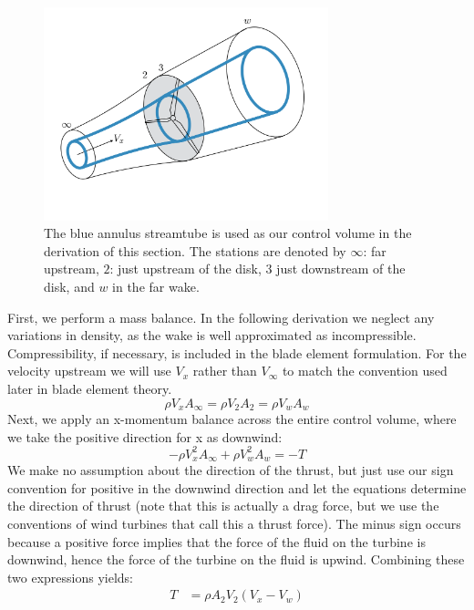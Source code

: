 \documentclass{article}
\begin{document}
\begin{figure}[htbp]
\centering
\includegraphics[width=3.25in]{figures/annulus}
\caption{The blue annulus streamtube is used as our control volume in the derivation of this section.  The stations are denoted by $\infty$: far upstream, $2$: just upstream of the disk, $3$ just downstream of the disk, and $w$ in the far wake.}
\label{fig:annulus}
\end{figure}

First, we perform a mass balance.  In the following derivation we neglect any variations in density, as the wake is well approximated as incompressible.  Compressibility, if necessary, is included in the blade element formulation.  For the velocity upstream we will use $V_x$ rather than $V_\infty$ to match the convention used later in blade element theory.
\begin{equation}
    \rho V_x A_\infty = \rho V_2 A_2 = \rho V_w A_w
\end{equation}
Next, we apply an x-momentum balance across the entire control volume, where we take the positive direction for x as downwind:
\begin{equation}
    -\rho V_x^2 A_\infty + \rho V_w^2 A_w = - T
\end{equation}
We make no assumption about the direction of the thrust, but just use our sign convention for positive in the downwind direction and let the equations determine the direction of thrust (note that this is actually a drag force, but we use the conventions of wind turbines that call this a thrust force).  The minus sign occurs because a positive force implies that the force of the fluid on the turbine is downwind, hence the force of the turbine on the fluid is upwind.  Combining these two expressions yields:
\begin{equation}
\begin{aligned}
    T &= \rho A_2 V_2 (V_x - V_w)\\
\end{aligned}
\label{eq:thrust1}
\end{equation}
\end{document}
